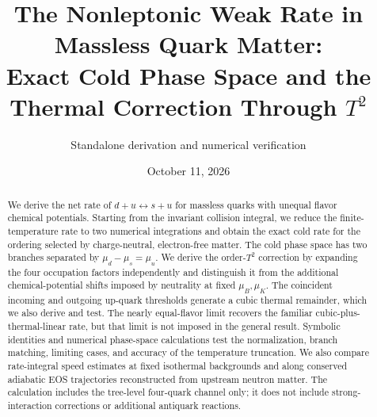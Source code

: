 \documentclass[11pt,letterpaper]{article}
\title{The Nonleptonic Weak Rate in Massless Quark Matter:\\Exact Cold Phase Space and the Thermal Correction Through \(T^2\)}
\author{Standalone derivation and numerical verification}
\date{October 11, 2026}
\numberwithin{equation}{section}
\begin{document}
\maketitle
\begin{abstract}
We derive the net rate of \(d+u\leftrightarrow s+u\) for massless quarks with unequal flavor chemical potentials.
Starting from the invariant collision integral, we reduce the finite-temperature rate to two numerical integrations and obtain the exact cold rate for the ordering selected by charge-neutral, electron-free matter.
The cold phase space has two branches separated by \(\mu_d-\mu_s=\mu_u\).
We derive the order-\(T^2\) correction by expanding the four occupation factors independently and distinguish it from the additional chemical-potential shifts imposed by neutrality at fixed \(\mu_B,\mu_K\).
The coincident incoming and outgoing up-quark thresholds generate a cubic thermal remainder, which we also derive and test.
The nearly equal-flavor limit recovers the familiar cubic-plus-thermal-linear rate, but that limit is not imposed in the general result.
Symbolic identities and numerical phase-space calculations test the normalization, branch matching, limiting cases, and accuracy of the temperature truncation.
We also compare rate-integral speed estimates at fixed isothermal backgrounds and along conserved adiabatic EOS trajectories reconstructed from upstream neutron matter.
The calculation includes the tree-level four-quark channel only; it does not include strong-interaction corrections or additional antiquark reactions.
\end{abstract}
\end{document}

